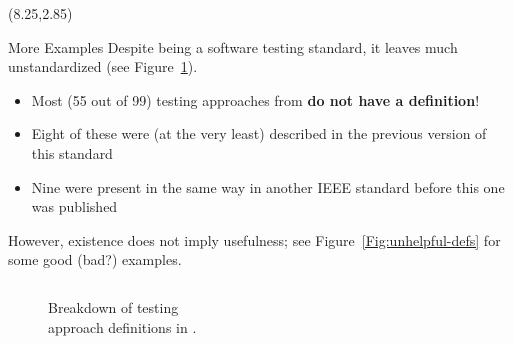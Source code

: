 \documentclass[22pt]{beamer}
\begin{document}
\begin{frame}[fragile]
    \begin{textblock}{7.25}(8.25,2.85)
        \begin{block}{\fontsize{37}{20}\selectfont More Examples}
            Despite \cite{IEEE2022} being a software testing standard, it
            leaves much unstandardized (see Figure~\ref{Fig:IEEEdefs}).
            \begin{itemize}
                \item Most (55 out of 99) testing approaches from \cite{IEEE2022}
                      \textbf{do not have a definition}!
                \item Eight of these were (at the very least) described in the
                      previous version of this standard \cite{IEEE2013}
                \item Nine were present in the same way in another IEEE
                      standard \cite{IEEE2017} before this one was published
            \end{itemize}
            \vspace{5mm}
            However, existence does not imply usefulness; see
            Figure~\ref{Fig:unhelpful-defs} for some good (bad?) examples.
            \vspace{-8mm}
            \begin{columns}
                \begin{column}{0.375\textwidth}
                    \begin{center}
                        \begin{figure}
                            \caption{Breakdown of testing\\approach definitions in
                                \cite{IEEE2022}.}
                            \label{Fig:IEEEdefs}
                        \end{figure}
                    \end{center}
                \end{column}

\end{columns}
\end{block}
\end{textblock}
\end{frame}
\end{document}
